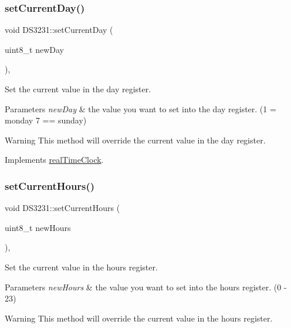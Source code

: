 \subsubsection{\texorpdfstring{set\+Current\+Day()}{setCurrentDay()}}
{\footnotesize\ttfamily void D\+S3231\+::set\+Current\+Day (\begin{DoxyParamCaption}\item[{uint8\+\_\+t}]{new\+Day }\end{DoxyParamCaption})\hspace{0.3cm}{\ttfamily [override]}, {\ttfamily [virtual]}}



Set the current value in the day register. 


\begin{DoxyParams}{Parameters}
{\em new\+Day} & the value you want to set into the day register. (1 = monday 7 == sunday) \\
\hline
\end{DoxyParams}
\begin{DoxyWarning}{Warning}
This method will override the current value in the day register. 
\end{DoxyWarning}


Implements \mbox{\hyperlink{classreal_time_clock_a4a80a695cbb55860921f92509fae0cd0}{real\+Time\+Clock}}.

\mbox{\label{class_d_s3231_ae59c15abcccd8e27eadebcd150db810e}} 
\subsubsection{\texorpdfstring{set\+Current\+Hours()}{setCurrentHours()}}
{\footnotesize\ttfamily void D\+S3231\+::set\+Current\+Hours (\begin{DoxyParamCaption}\item[{uint8\+\_\+t}]{new\+Hours }\end{DoxyParamCaption})\hspace{0.3cm}{\ttfamily [override]}, {\ttfamily [virtual]}}



Set the current value in the hours register. 


\begin{DoxyParams}{Parameters}
{\em new\+Hours} & the value you want to set into the hours register. (0 -\/ 23) \\
\hline
\end{DoxyParams}
\begin{DoxyWarning}{Warning}
This method will override the current value in the hours register. 
\end{DoxyWarning}


